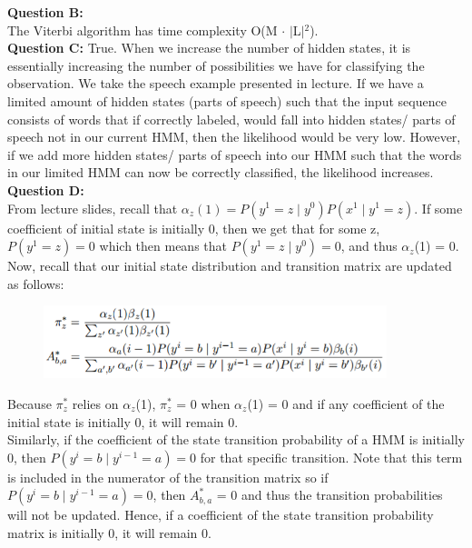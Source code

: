 \documentclass[12 pt]{article}
\begin{document}
	\noindent\textbf{Question B:} \\ The Viterbi algorithm has time complexity O(M $\cdot$ $|$L$|$$^2$).\\

	
	\noindent\textbf{Question C:}  True. When we increase the number of hidden states, it is essentially increasing the number of possibilities we have for classifying the observation. We take the speech example presented in lecture. If we have a limited amount of hidden states (parts of speech) such that the input sequence consists of words that if correctly labeled, would fall into hidden states/ parts of speech not in our current HMM, then the likelihood would be very low. However, if we add more hidden states/ parts of speech into our HMM such that the words in our limited HMM can now be correctly classified, the likelihood increases.  \\
	
	\noindent\textbf{Question D:} \\
	\noindent From lecture slides, recall that $\alpha_z(1) = P(y^1 = z \;|\; y^0) P(x^1 \;| \;y^1 = z)$. If some coefficient of initial state is initially 0, then we get that for some z, $P(y^1 = z) = 0$ which then means that $P(y^1 = z \;|\; y^0) = 0$, and thus $\alpha_z$(1) = 0. Now, recall that our initial state distribution and transition matrix are updated as follows:
	
	\begin{figure}[H]
		\centering
	\includegraphics[width=10cm]{equations}
	\end{figure}	

	\noindent Because $\pi^*_z$ relies on $\alpha_z$(1), $\pi^*_z$ = 0 when $\alpha_z$(1) = 0 and if any coefficient of the initial state is initially 0, it will remain 0. \\
	
	\noindent Similarly, if the coefficient of the state transition probability of a HMM is initially 0, then $P(y^i = b \;|\; y^{i-1} = a) = 0$ for that specific transition. Note that this term is included in the numerator of the transition matrix so if $P(y^i = b \;|\; y^{i-1} = a) = 0$, then $A^*_{b,a}$ = 0 and thus the transition probabilities will not be updated. Hence, if a coefficient of the state transition probability matrix is initially 0, it will remain 0.
	\\
	
\end{document}
